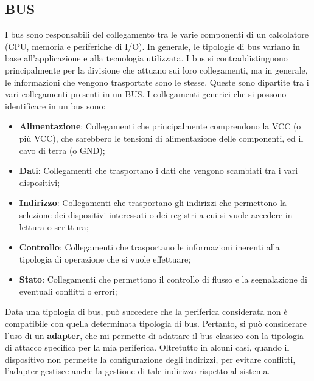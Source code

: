 \subsection{BUS}
I bus sono responsabili del collegamento tra le varie componenti di un calcolatore (CPU, memoria e periferiche di I/O).
In generale, le tipologie di bus variano in base all'applicazione e alla tecnologia utilizzata. I bus si contraddistinguono principalmente per la divisione che attuano sui loro collegamenti, ma in generale, le informazioni che vengono trasportate sono le stesse.
Queste sono dipartite tra i vari collegamenti presenti in un BUS. I collegamenti generici che si possono identificare in un bus sono:
\begin{itemize}
    \item \textbf{Alimentazione}: Collegamenti che principalmente comprendono la VCC (o più VCC), che sarebbero le tensioni di alimentazione delle componenti, ed il cavo di terra (o GND);
    \item \textbf{Dati}: Collegamenti che trasportano i dati che vengono scambiati tra i vari dispositivi;
    \item \textbf{Indirizzo}: Collegamenti che trasportano gli indirizzi che permettono la selezione dei dispositivi interessati o dei registri a cui si vuole accedere in lettura o scrittura;
    \item \textbf{Controllo}: Collegamenti che trasportano le informazioni inerenti alla tipologia di operazione che si vuole effettuare;
    \item \textbf{Stato}: Collegamenti che permettono il controllo di flusso e la segnalazione di eventuali conflitti o errori;
\end{itemize}

Data una tipologia di bus, può succedere che la periferica considerata non è compatibile con quella determinata tipologia di bus. Pertanto, si può considerare l'uso di un \textbf{adapter}, che mi permette di adattare il bus classico con la tipologia di attacco specifica per la mia periferica. Oltretutto in alcuni casi, quando il dispositivo non permette la configurazione degli indirizzi, per evitare conflitti, l'adapter gestisce anche la gestione di tale indirizzo rispetto al sistema.

